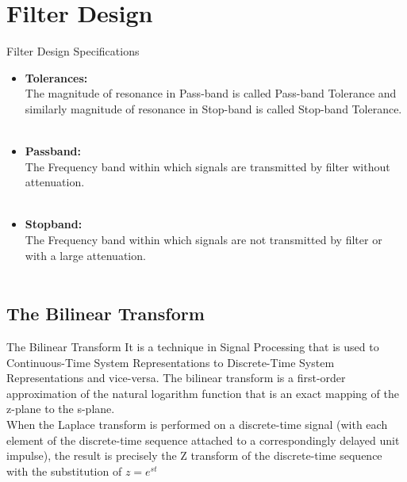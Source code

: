 \documentclass{beamer}
\begin{document}
\section{Filter Design}
\begin{frame}{Filter Design Specifications}
\begin{itemize}
    \item \textbf{Tolerances:}\\
The magnitude of resonance in Pass-band is called Pass-band Tolerance and
similarly magnitude of resonance in Stop-band is called Stop-band Tolerance.\\~\\
\item \textbf{Passband:}\\
The Frequency band within which signals are transmitted by filter without
attenuation.\\~\\

\item \textbf{Stopband:}\\
The Frequency band within which signals are not transmitted by filter or with a large attenuation.\\~\\
\end{itemize}
\end{frame}
\subsection{The Bilinear Transform}
\begin{frame}{The Bilinear Transform}
    \smallskip \hspace{2ex} It is a technique in Signal Processing that is used to Continuous-Time System
Representations to Discrete-Time System Representations and vice-versa. The bilinear transform is a first-order approximation of the natural logarithm function that is an exact mapping of the z-plane to the s-plane. \\
\smallskip \hspace{2ex} When the Laplace transform is performed on a discrete-time signal (with each element of the discrete-time sequence attached to a correspondingly delayed unit impulse), the result is precisely the $\mathrm{Z}$ transform of the discrete-time sequence with the substitution of $z=e^{s t}$\\~\\

\end{frame}
\end{document}
